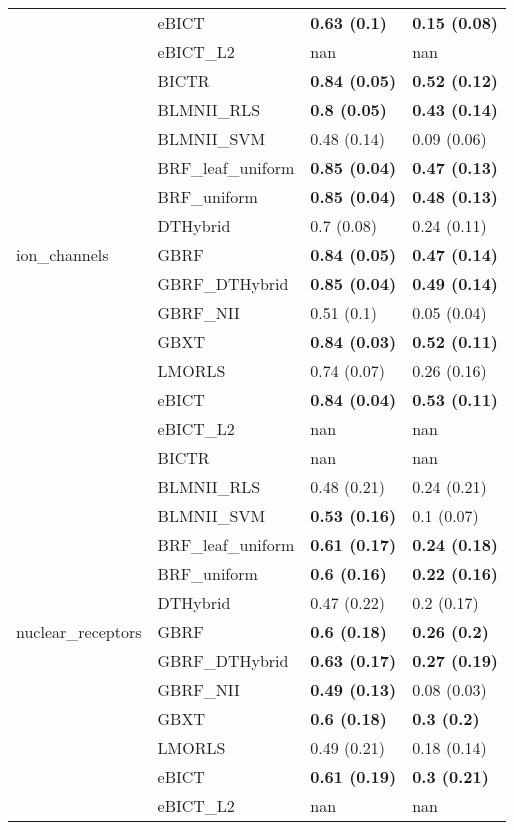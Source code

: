 \begin{tabular}{llll}
 & eBICT & \textbf{0.63 (0.1)} & \textbf{0.15 (0.08)} \\
 & eBICT\_L2 & nan & nan \\
\cline{1-2}
\multirow[c]{13}{*}{ion\_channels} & BICTR & \textbf{0.84 (0.05)} & \textbf{0.52 (0.12)} \\
 & BLMNII\_RLS & \textbf{0.8 (0.05)} & \textbf{0.43 (0.14)} \\
 & BLMNII\_SVM & 0.48 (0.14) & 0.09 (0.06) \\
 & BRF\_leaf\_uniform & \textbf{0.85 (0.04)} & \textbf{0.47 (0.13)} \\
 & BRF\_uniform & \textbf{0.85 (0.04)} & \textbf{0.48 (0.13)} \\
 & DTHybrid & 0.7 (0.08) & 0.24 (0.11) \\
 & GBRF & \textbf{0.84 (0.05)} & \textbf{0.47 (0.14)} \\
 & GBRF\_DTHybrid & \textbf{0.85 (0.04)} & \textbf{0.49 (0.14)} \\
 & GBRF\_NII & 0.51 (0.1) & 0.05 (0.04) \\
 & GBXT & \textbf{0.84 (0.03)} & \textbf{0.52 (0.11)} \\
 & LMORLS & 0.74 (0.07) & 0.26 (0.16) \\
 & eBICT & \textbf{0.84 (0.04)} & \textbf{0.53 (0.11)} \\
 & eBICT\_L2 & nan & nan \\
\cline{1-2}
\multirow[c]{13}{*}{nuclear\_receptors} & BICTR & nan & nan \\
 & BLMNII\_RLS & 0.48 (0.21) & 0.24 (0.21) \\
 & BLMNII\_SVM & \textbf{0.53 (0.16)} & 0.1 (0.07) \\
 & BRF\_leaf\_uniform & \textbf{0.61 (0.17)} & \textbf{0.24 (0.18)} \\
 & BRF\_uniform & \textbf{0.6 (0.16)} & \textbf{0.22 (0.16)} \\
 & DTHybrid & 0.47 (0.22) & 0.2 (0.17) \\
 & GBRF & \textbf{0.6 (0.18)} & \textbf{0.26 (0.2)} \\
 & GBRF\_DTHybrid & \textbf{0.63 (0.17)} & \textbf{0.27 (0.19)} \\
 & GBRF\_NII & \textbf{0.49 (0.13)} & 0.08 (0.03) \\
 & GBXT & \textbf{0.6 (0.18)} & \textbf{0.3 (0.2)} \\
 & LMORLS & 0.49 (0.21) & 0.18 (0.14) \\
 & eBICT & \textbf{0.61 (0.19)} & \textbf{0.3 (0.21)} \\
 & eBICT\_L2 & nan & nan \\
\cline{1-2}
\bottomrule
\end{tabular}
